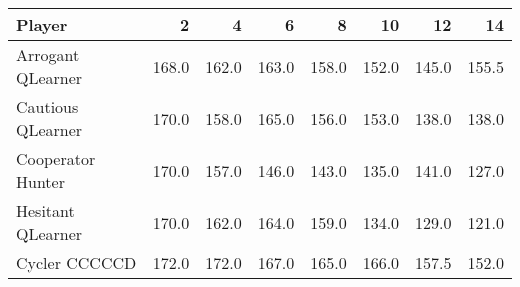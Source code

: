\begin{tabular}{lrrrrrrr}
\toprule
            Player &      2 &      4 &      6 &      8 &     10 &     12 &     14 \\
\midrule
 Arrogant QLearner &  168.0 &  162.0 &  163.0 &  158.0 &  152.0 &  145.0 &  155.5 \\
 Cautious QLearner &  170.0 &  158.0 &  165.0 &  156.0 &  153.0 &  138.0 &  138.0 \\
 Cooperator Hunter &  170.0 &  157.0 &  146.0 &  143.0 &  135.0 &  141.0 &  127.0 \\
 Hesitant QLearner &  170.0 &  162.0 &  164.0 &  159.0 &  134.0 &  129.0 &  121.0 \\
     Cycler CCCCCD &  172.0 &  172.0 &  167.0 &  165.0 &  166.0 &  157.5 &  152.0 \\
\bottomrule
\end{tabular}
